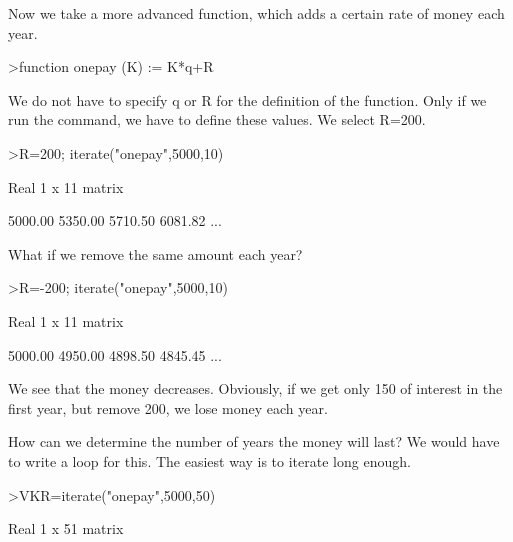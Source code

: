 \documentclass{article}
\begin{document}
\begin{eulernotebook}
\begin{eulercomment}
\begin{eulercomment}
\begin{eulercomment}
\begin{eulercomment}
\begin{eulercomment}
\begin{eulercomment}
\begin{eulercomment}
\begin{eulercomment}
\begin{eulercomment}
\begin{eulercomment}
\begin{eulercomment}
Now we take a more advanced function, which adds a certain rate of money each
year.
\end{eulercomment}
\begin{eulerprompt}
>function onepay (K) := K*q+R
\end{eulerprompt}
\begin{eulercomment}
We do not have to specify q or R for the definition of the function. Only if
we run the command, we have to define these values. We select R=200.
\end{eulercomment}
\begin{eulerprompt}
>R=200; iterate("onepay",5000,10)
\end{eulerprompt}
\begin{euleroutput}
  Real 1 x 11 matrix
  
      5000.00     5350.00     5710.50     6081.82     ...
\end{euleroutput}
\begin{eulercomment}
What if we remove the same amount each year?
\end{eulercomment}
\begin{eulerprompt}
>R=-200; iterate("onepay",5000,10)
\end{eulerprompt}
\begin{euleroutput}
  Real 1 x 11 matrix
  
      5000.00     4950.00     4898.50     4845.45     ...
\end{euleroutput}
\begin{eulercomment}
We see that the money decreases. Obviously, if we get only 150 of interest in
the first year, but remove 200, we lose money each year.

How can we determine the number of years the money will last? We would have
to write a loop for this. The easiest way is to iterate long enough.
\end{eulercomment}
\begin{eulerprompt}
>VKR=iterate("onepay",5000,50)
\end{eulerprompt}
\begin{euleroutput}
  Real 1 x 51 matrix
  

\end{euleroutput}
\end{eulercomment}
\end{eulercomment}
\end{eulercomment}
\end{eulercomment}
\end{eulercomment}
\end{eulercomment}
\end{eulercomment}
\end{eulercomment}
\end{eulercomment}
\end{eulercomment}
\end{eulernotebook}
\end{document}
